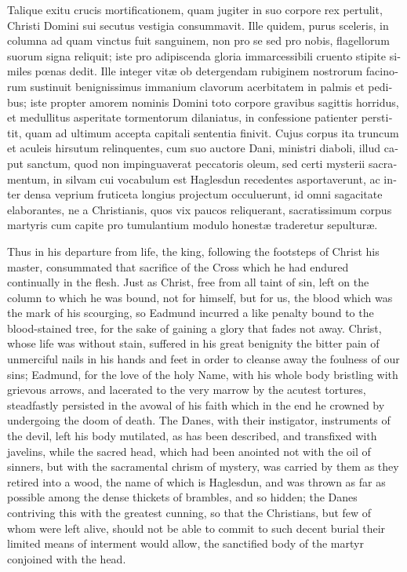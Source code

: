 \documentclass[10pt]{book}
\begin{document}
\begin{paracol}{2}
\switchcolumn*

\begin{otherlanguage}{latin}
Talique exitu crucis mortificationem, quam jugiter in suo corpore rex pertulit, Christi Domini sui secutus vestigia consummavit. Ille quidem, purus sceleris, in columna ad quam vinctus fuit sanguinem, non pro se sed pro nobis, flagellorum suorum signa reliquit; iste pro adipiscenda gloria immarcessibili cruento stipite similes p\oe{}nas dedit. Ille integer vit\ae{} ob detergendam rubiginem nostrorum facinorum sustinuit benignissimus immanium clavorum acerbitatem in palmis et pedibus; iste propter amorem nominis Domini toto corpore gravibus sagittis horridus, et medullitus asperitate tormentorum dilaniatus, in confessione patienter perstitit, quam ad ultimum accepta capitali sententia finivit. Cujus corpus ita truncum et aculeis hirsutum relinquentes, cum suo auctore Dani, ministri diaboli, illud caput sanctum, quod non impinguaverat peccatoris oleum, sed certi mysterii sacramentum, in silvam cui vocabulum est Haglesdun recedentes asportaverunt, ac inter densa veprium fruticeta longius projectum occuluerunt, id omni sagacitate elaborantes, ne a Christianis, quos vix paucos reliquerant, sacratissimum corpus martyris cum capite pro tumulantium modulo honest\ae{} traderetur sepultur\ae{}.
\end{otherlanguage}

\switchcolumn

Thus in his departure from life, the king, following the footsteps of Christ his master, consummated that sacrifice of the Cross which he had endured continually in the flesh. Just as Christ, free from all taint of sin, left on the column to which he was bound, not for himself, but for us, the blood which was the mark of his scourging, so Eadmund incurred a like penalty bound to the blood-stained tree, for the sake of gaining a glory that fades not away. Christ, whose life was without stain, suffered in his great benignity the bitter pain of unmerciful nails in his hands and feet in order to cleanse away the foulness of our sins; Eadmund, for the love of the holy Name, with his whole body bristling with grievous arrows, and lacerated to the very marrow by the acutest tortures, steadfastly persisted in the avowal of his faith which in the end he crowned by undergoing the doom of death. The Danes, with their instigator, instruments of the devil, left his body mutilated, as has been described, and transfixed with javelins, while the sacred head, which had been anointed not with the oil of sinners, but with the sacramental chrism of mystery, was carried by them as they retired into a wood, the name of which is Haglesdun, and was thrown as far as possible among the dense thickets of brambles, and so hidden; the Danes contriving this with the greatest cunning, so that the Christians, but few of whom were left alive, should not be able to commit to such decent burial their limited means of interment would allow, the sanctified body of the martyr conjoined with the head.


\end{paracol}
\end{document}
